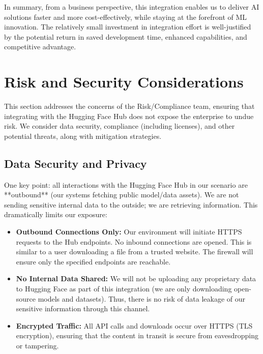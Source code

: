 \documentclass{article}
\begin{document}
In summary, from a business perspective, this integration enables us to deliver AI solutions faster and more cost-effectively, while staying at the forefront of ML innovation. The relatively small investment in integration effort is well-justified by the potential return in saved development time, enhanced capabilities, and competitive advantage.

\section{Risk and Security Considerations}
This section addresses the concerns of the Risk/Compliance team, ensuring that integrating with the Hugging Face Hub does not expose the enterprise to undue risk. We consider data security, compliance (including licenses), and other potential threats, along with mitigation strategies.

\subsection*{Data Security and Privacy}
One key point: all interactions with the Hugging Face Hub in our scenario are **outbound** (our systems fetching public model/data assets). We are not sending sensitive internal data to the outside; we are retrieving information. This dramatically limits our exposure:
\begin{itemize}
    \item \textbf{Outbound Connections Only:} Our environment will initiate HTTPS requests to the Hub endpoints. No inbound connections are opened. This is similar to a user downloading a file from a trusted website. The firewall will ensure only the specified endpoints are reachable.
    \item \textbf{No Internal Data Shared:} We will not be uploading any proprietary data to Hugging Face as part of this integration (we are only downloading open-source models and datasets). Thus, there is no risk of data leakage of our sensitive information through this channel.
    \item \textbf{Encrypted Traffic:} All API calls and downloads occur over HTTPS (TLS encryption), ensuring that the content in transit is secure from eavesdropping or tampering.
\end{itemize}
\end{document}
